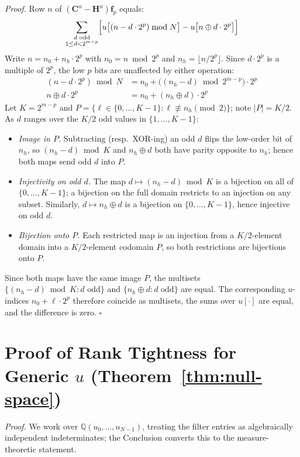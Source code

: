 \documentclass[10pt,a4paper]{amsart}
\begin{document}
\noindent\textit{Proof.} Row $n$ of $(\mathbf{C}^u-\mathbf{H}^u)\mathbf{f}_p$ equals:
\[
    \sum_{\substack{d \text{ odd} \\ 1 \leq d < 2^{m-p}}} \Bigl[u\bigl[(n - d\cdot 2^p)\bmod N\bigr] - u\bigl[n \oplus d\cdot 2^p\bigr]\Bigr]
\]
Write $n = n_0 + n_h\cdot 2^p$ with $n_0 = n\bmod 2^p$ and $n_h = \lfloor n/2^p\rfloor$. Since $d\cdot 2^p$ is a multiple of $2^p$, the low $p$ bits are unaffected by either operation:
\begin{align*}
    (n - d\cdot 2^p)\bmod N &= n_0 + \bigl((n_h - d)\bmod 2^{m-p}\bigr)\cdot 2^p \\
    n \oplus d\cdot 2^p &= n_0 + (n_h \oplus d)\cdot 2^p
\end{align*}
Let $K = 2^{m-p}$ and $P = \{\ell \in \{0,\ldots,K-1\} : \ell \not\equiv n_h \pmod{2}\}$; note $|P| = K/2$. As $d$ ranges over the $K/2$ odd values in $\{1,\ldots,K-1\}$:
\begin{itemize}
\item \emph{Image in $P$.} Subtracting (resp.\ XOR-ing) an odd $d$ flips the low-order bit of $n_h$, so $(n_h - d)\bmod K$ and $n_h \oplus d$ both have parity opposite to $n_h$; hence both maps send odd $d$ into $P$.
\item \emph{Injectivity on odd $d$.} The map $d\mapsto(n_h-d)\bmod K$ is a bijection on all of $\{0,\ldots,K-1\}$; a bijection on the full domain restricts to an injection on any subset. Similarly, $d\mapsto n_h\oplus d$ is a bijection on $\{0,\ldots,K-1\}$, hence injective on odd $d$.
\item \emph{Bijection onto $P$.} Each restricted map is an injection from a $K/2$-element domain into a $K/2$-element codomain $P$, so both restrictions are bijections onto $P$.
\end{itemize}
Since both maps have the same image $P$, the multisets $\{(n_h-d)\bmod K : d\text{ odd}\}$ and $\{n_h\oplus d : d\text{ odd}\}$ are equal. The corresponding $u$-indices $n_0 + \ell\cdot 2^p$ therefore coincide as multisets, the sums over $u[\cdot]$ are equal, and the difference is zero. $\square$

\section{Proof of Rank Tightness for Generic $u$ (Theorem~\ref{thm:null-space})}
\label{app:rank-tightness}

\noindent\textit{Proof.} We work over $\mathbb{Q}(u_0,\ldots,u_{N-1})$, treating the filter entries as algebraically independent indeterminates; the Conclusion converts this to the measure-theoretic statement.
\end{document}
